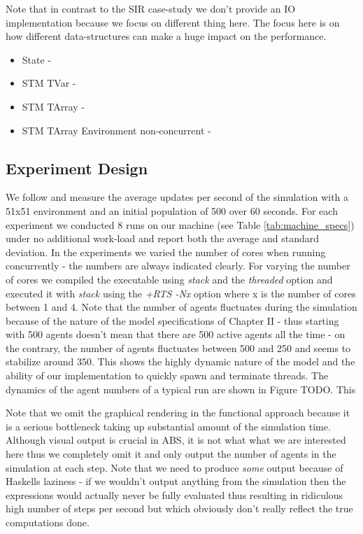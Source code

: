 Note that in contrast to the SIR case-study we don't provide an IO implementation because we focus on different thing here. The focus here is on how different data-structures can make a huge impact on the performance.


\begin{itemize}
	\item State - 
	\item STM TVar -
	\item STM TArray -
	\item STM TArray Environment non-concurrent -
\end{itemize}

\subsection{Experiment Design}
We follow \cite{lysenko_framework_2008} and measure the average updates per second of the simulation with a 51x51 environment and an initial population of 500 over 60 seconds. For each experiment we conducted 8 runs on our machine (see Table \ref{tab:machine_specs}) under no additional work-load and report both the average and standard deviation. In the experiments we varied the number of cores when running concurrently - the numbers are always indicated clearly. For varying the number of cores we compiled the executable using \textit{stack} and the \textit{threaded} option and executed it with \textit{stack} using the \textit{+RTS -Nx} option where x is the number of cores between 1 and 4.
Note that the number of agents fluctuates during the simulation because of the nature of the model specifications of Chapter II - thus starting with 500 agents doesn't mean that there are 500 active agents all the time - on the contrary, the number of agents fluctuates between 500 and 250 and seems to stabilize around 350. This shows the highly dynamic nature of the model and the ability of our implementation to quickly spawn and terminate threads. The dynamics of the agent numbers of a typical run are shown in Figure TODO. This  

Note that we omit the graphical rendering in the functional approach because it is a serious bottleneck taking up substantial amount of the simulation time. Although visual output is crucial in ABS, it is not what what we are interested here thus we completely omit it and only output the number of agents in the simulation at each step. Note that we need to produce \textit{some} output because of Haskells laziness - if we wouldn't output anything from the simulation then the expressions would actually never be fully evaluated thus resulting in ridiculous high number of steps per second but which obviously don't really reflect the true computations done.

